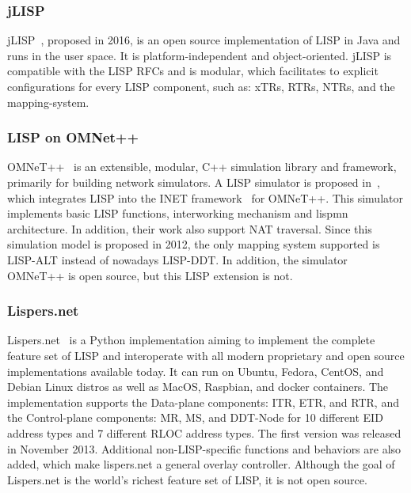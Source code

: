 \subsubsection{jLISP}
\label{subsubsec:implementation_jLISP}
jLISP~\cite{stockmayer2016jlisp}, proposed in 2016, is an open source implementation of LISP in Java and runs in the user space. It is platform-independent and object-oriented. jLISP is compatible with the LISP RFCs and is modular, which facilitates to explicit configurations for every LISP component, such as: xTRs, RTRs, NTRs, and the mapping-system.

\subsubsection{LISP on OMNet++}
\label{subsubsec:implementation_OMNet}
OMNeT++~\cite{omnetpp} is an extensible, modular, C++ simulation library and framework, primarily for building network simulators. A LISP simulator is proposed in~\cite{klein2012integration}, which integrates LISP into the INET framework~\cite{INET} for OMNeT++. This simulator implements basic LISP functions, interworking mechanism and \acrshort{lispmn} architecture. In addition, their work also support NAT traversal. Since this simulation model is proposed in 2012, the only mapping system supported is LISP-ALT instead of nowadays LISP-DDT. In addition, the simulator OMNeT++ is open source, but this LISP extension is not. %

\subsubsection{Lispers.net}
\label{subsubsec:implementation_lispers}
Lispers.net~\cite{lispers} is a Python implementation aiming to implement the complete feature set of LISP and interoperate with all modern proprietary and open source implementations available today. It can run on Ubuntu, Fedora, CentOS, and Debian Linux distros as well as MacOS, Raspbian, and docker containers. The implementation supports the Data-plane components: ITR, ETR, and RTR, and the Control-plane components: MR, MS, and DDT-Node for 10 different EID address types and 7 different RLOC address types. The first version was released in November 2013. Additional non-LISP-specific functions and behaviors are also added, which make lispers.net a general overlay controller. %
Although the goal of Lispers.net is the world's richest feature set of LISP, it is not open source.


